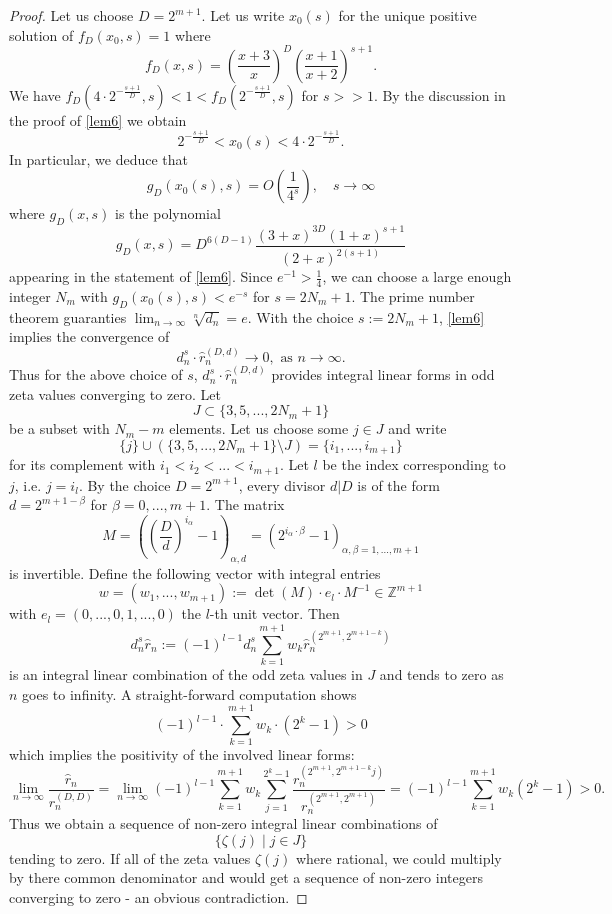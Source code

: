 \documentclass[11pt]{amsart}
\theoremstyle{plain}
\theoremstyle{remark}
\theoremstyle{definition}
\newcommand{\ZZ}{\mathbb{Z}}
\begin{document}
\begin{proof}
Let us choose $D=2^{m+1}$. Let us write $x_{0}(s)$ for the unique positive solution of $f_{D}(x_0,s)=1$ where
\[
	f_{D}(x,s)=\left(\frac{x+3}{x}\right)^D\left( \frac{x+1}{x+2} \right)^{s+1}.
\]
We have $f_{D}(4\cdot 2^{-\frac{s+1}{D}},s)<1<f_{D}(2^{-\frac{s+1}{D}},s)$ for $s>>1$. By the discussion in the proof of \cref{lem6} we obtain
\[
	2^{-\frac{s+1}{D}}<x_{0}(s)<4\cdot 2^{-\frac{s+1}{D}}.
\]
In particular, we deduce that
\[
	g_{D}(x_0(s),s)=O\left(\frac{1}{4^s}\right),\quad s\rightarrow \infty
\]
where $g_{D}(x,s)$ is the polynomial
\[
g_{D}(x,s)=D^{6(D-1)}\frac{(3+x)^{3D}(1+x)^{s+1}}{(2+x)^{2(s+1)}}
\]
appearing in the statement of \cref{lem6}. Since $e^{-1}>\frac{1}{4}$, we can choose a large enough integer $N_m$ with $g_{D}(x_0(s),s)<e^{-s}$ for $s=2N_m+1$. The prime number theorem guaranties $\lim_{n\rightarrow \infty} \sqrt[n]{d_n}=e$. With the choice $s:=2N_m+1$, \cref{lem6} implies the convergence of
\[
	d_n^s\cdot \hat{r}_n^{(D,d)} \rightarrow 0,\text{ as }n\rightarrow\infty.
\]
Thus for the above choice of $s$, $d_n^s\cdot \hat{r}_n^{(D,d)}$ provides integral linear forms in odd zeta values converging to zero. Let
\[
	J\subset \{ 3,5,...,2N_m+1 \}
\]
be a subset with $N_m-m$ elements. Let us choose some $j\in J$ and write
\[
	\{j\}\cup (\{ 3,5,...,2N_m+1 \}\setminus J)=\{ i_1,...,i_{m+1} \}
\]
for its complement with $i_1<i_2<...<i_{m+1}$. Let $l$ be the index corresponding to $j$, i.e. $j=i_l$. By the choice $D=2^{m+1}$, every divisor $d|D$ is of the form $d=2^{m+1-\beta}$ for $\beta=0,...,m+1$. The matrix
\[
	M=\left( \left(\frac{D}{d}\right)^{i_\alpha}-1 \right)_{\alpha,d}=(2^{i_\alpha\cdot \beta}-1)_{\alpha,\beta=1,...,m+1}
\]
is invertible. Define the following vector with integral entries
\[
	w=(w_1,...,w_{m+1}):=\det(M)\cdot e_l\cdot M^{-1}\in \ZZ^{m+1}
\]
with $e_l=(0,...,0,1,...,0)$ the $l$-th unit vector. Then
\[
	d_n^s\hat{r}_n:=(-1)^{l-1}d_n^s\sum_{k=1}^{m+1}w_k \hat{r}_n^{(2^{m+1},2^{m+1-k})}
\]
is an integral linear combination of the odd zeta values in $J$ and tends to zero as $n$ goes to infinity. A straight-forward computation shows
\[
	(-1)^{l-1}\cdot \sum_{k=1}^{m+1}w_k \cdot \left(2^{k}-1\right)>0
\]
which implies the positivity of the involved linear forms:
\[
	\lim_{n\rightarrow \infty} \frac{\hat{r}_n}{r_n^{(D,D)}}=\lim_{n\rightarrow \infty} (-1)^{l-1}\sum_{k=1}^{m+1}w_k\sum_{j=1}^{2^k-1}\frac{r_n^{(2^{m+1},2^{m+1-k}j)}}{r_n^{(2^{m+1},2^{m+1})}}=(-1)^{l-1}\sum_{k=1}^{m+1}w_k\left(2^k-1\right)>0.
\]
Thus we obtain a sequence of non-zero integral linear combinations of 
\[
	\{ \zeta(j)\mid j\in J \}
\]
tending to zero. If all of the zeta values $\zeta(j)$ where rational, we could multiply by there common denominator and would get a sequence of non-zero integers converging to zero - an obvious contradiction.
\end{proof}
\end{document}
